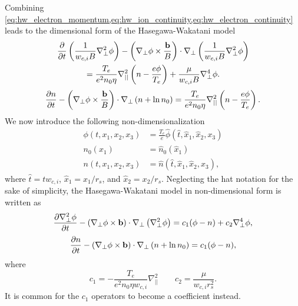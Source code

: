 \documentclass[oneside,a4paper,11pt]{report}
\begin{document}
Combining \cref{eq:hw_electron_momentum,eq:hw_ion_continuity,eq:hw_electron_continuity} leads to the dimensional form of the Hasegawa-Wakatani model
\begin{multline}
    \frac{\partial}{\partial t} \left ( \frac{1}{w_{c,i} B} \nabla^2_\perp \phi \right ) - \left (\nabla_\perp \phi \times \frac{\mathbf{b}}{B} \right ) \cdot \nabla_\perp \left ( \frac{1}{w_{c,i} B} \nabla^2_\perp \phi \right ) \\
    = \frac{T_e}{e^2 n_0 \eta} \nabla_{||}^2 \left (n - \frac{e \phi}{T_e} \right ) + \frac{\mu}{w_{c,i} B} \nabla^4_\perp \phi.
\end{multline}
\begin{equation}
    \frac{\partial n}{\partial t} - \left ( \nabla_\perp \phi \times \frac{\mathbf{b}}{B} \right ) \cdot \nabla_\perp \left ( n + \ln n_0 \right ) = \frac{T_e}{e^2 n_0 \eta} \nabla_{||}^2 \left (n - \frac{e \phi}{T_e} \right ).
\end{equation}
We now introduce the following non-dimensionalization
\begin{align}
    \phi(t,x_1,x_2,x_3) &= \frac{T_e}{e} \hat{\phi}(\hat{t},\hat{x}_1,\hat{x}_2, x_3) \\
    n_0(x_1) &= \hat{n}_0(\hat{x}_1) \\
    n(t,x_1,x_2,x_3) &= \hat{n}(\hat{t}, \hat{x}_1, \hat{x}_2, x_3),
\end{align}
where $\hat{t} = t w_{c,i}$, $\hat{x}_1 = x_1 / r_s$, and $\hat{x}_2 = x_2 / r_s$. Neglecting the hat notation for the sake of simplicity, the Hasegawa-Wakatani model in non-dimensional form is written as
\begin{equation}
    \label{eq:hw_potential}
    \frac{\partial \nabla^2_\perp \phi}{\partial t} - \left (\nabla_\perp \phi \times \mathbf{b} \right ) \cdot \nabla_\perp \left ( \nabla^2_\perp \phi \right ) = c_1 ( \phi - n) + c_2 \nabla^4_\perp \phi,
\end{equation}
\begin{equation}
    \label{eq:hw_density}
    \frac{\partial n}{\partial t} - \left ( \nabla_\perp \phi \times \mathbf{b} \right ) \cdot \nabla_\perp \left ( n + \ln n_0 \right ) = c_1 (\phi - n),
\end{equation}
where
\begin{equation}
    c_1 = -\frac{T_e}{e^2 n_0 \eta w_{c,i}} \nabla^2_{||} \qquad c_2 = \frac{\mu}{w_{c,i} r_s^2}.
\end{equation}
It is common for the $c_1$ operators to become a coefficient instead.

\end{document}
